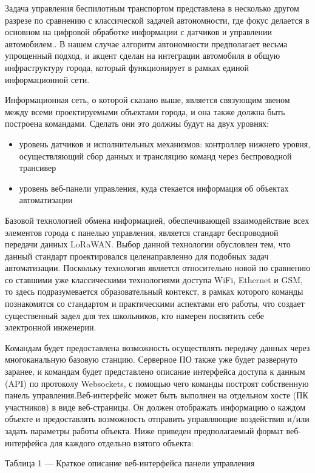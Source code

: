 Задача управления беспилотным транспортом представлена в несколько другом разрезе по сравнению с классической задачей автономности, где фокус делается в основном на цифровой обработке информации с датчиков и управлении автомобилем.. В нашем случае алгоритм автономности предполагает весьма упрощенный подход, и акцент сделан на интеграции автомобиля в общую инфраструктуру города, который функционирует в рамках единой информационной сети.

Информационная сеть, о которой сказано выше, является связующим звеном между всеми проектируемыми объектами города, и она также должна быть построена командами. Сделать они это должны будут на двух уровнях:
\begin{itemize}
    \item уровень датчиков и исполнительных механизмов: контроллер нижнего уровня, осуществляющий сбор данных и трансляцию команд через беспроводной трансивер
    \item уровень веб-панели управления, куда стекается информация об объектах автоматизации        
\end{itemize}

Базовой технологией обмена информацией, обеспечивающей взаимодействие всех элементов города с панелью управления, является стандарт беспроводной передачи данных LoRaWAN. Выбор данной технологии обусловлен тем, что данный стандарт проектировался целенаправленно для подобных задач автоматизации. Поскольку технология является относительно новой по сравнению со ставшими уже классическими технологиями доступа WiFi, Ethernet и GSM, то здесь подразумевается образовательный контекст, в рамках которого команды познакомятся со стандартом и практическими аспектами его работы, что создает существенный задел для тех школьников, кто намерен посвятить себе электронной инженерии. 

Командам будет предоставлена возможность осуществлять передачу данных через многоканальную базовую станцию. Серверное ПО также уже будет развернуто заранее, и командам будет представлено описание интерфейса доступа к данным (API) по протоколу Websockets, с помощью чего команды построят собственную панель управления.Веб-интерфейс может быть выполнен на отдельном хосте (ПК участников) в виде веб-страницы. Он должен отображать информацию о каждом объекте и предоставлять возможность отправить управляющие воздействия и/или задать параметры работы объекта. Ниже приведен предполагаемый формат веб-интерфейса для каждого отдельно взятого объекта:

\begin{center}
    Таблица 1 — Краткое описание веб-интерфейса панели управления
\end{center}

